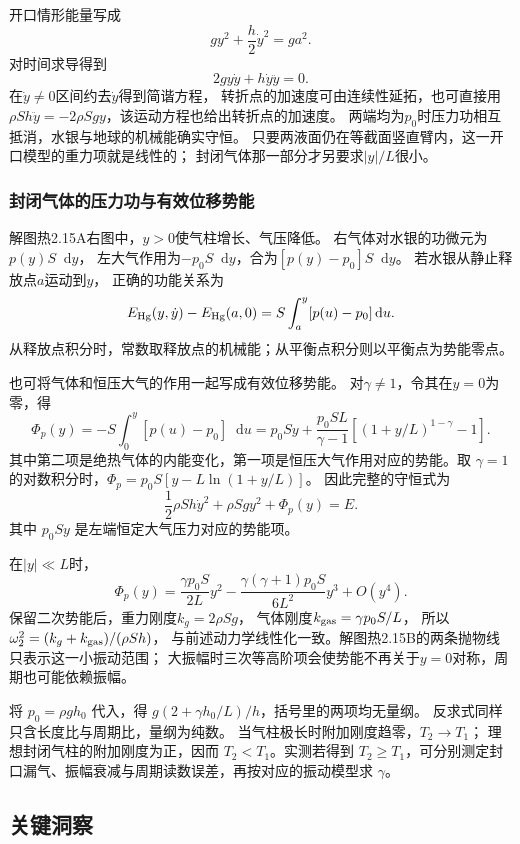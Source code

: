 \documentclass[UTF8,fontset=fandol,a4paper,11pt]{ctexart}
\newcommand{\dd}{\mathop{}\!\mathrm{d}}
\begin{document}
开口情形能量写成
\[
gy^2+\frac h2\dot y^2=ga^2.
\]
对时间求导得到
\[
2gy\dot y+h\dot y\ddot y=0.
\]
在$\dot y\ne0$区间约去$\dot y$得到简谐方程，
转折点的加速度可由连续性延拓，也可直接用
$\rho Sh\ddot y=-2\rho Sgy$，该运动方程也给出转折点的加速度。
两端均为$p_0$时压力功相互抵消，水银与地球的机械能确实守恒。
只要两液面仍在等截面竖直臂内，这一开口模型的重力项就是线性的；
封闭气体那一部分才另要求$|y|/L$很小。

\subsubsection*{封闭气体的压力功与有效位移势能}
解图热2.15A右图中，$y>0$使气柱增长、气压降低。
右气体对水银的功微元为$p(y)S\dd y$，
左大气作用为$-p_0S\dd y$，合为$[p(y)-p_0]S\dd y$。
若水银从静止释放点$a$运动到$y$，
正确的功能关系为
\[
E_{\rm Hg}(y,\dot y)-E_{\rm Hg}(a,0)
=S\int_a^y[p(u)-p_0]\dd u.
\]
从释放点积分时，常数取释放点的机械能；从平衡点积分则以平衡点为势能零点。

也可将气体和恒压大气的作用一起写成有效位移势能。
对$\gamma\ne1$，令其在$y=0$为零，得
\[
\Phi_p(y)=-S\int_0^y[p(u)-p_0]\dd u
=p_0Sy+\frac{p_0SL}{\gamma-1}
[(1+y/L)^{1-\gamma}-1].
\]
其中第二项是绝热气体的内能变化，第一项是恒压大气作用对应的势能。取 $\gamma=1$ 的对数积分时，$\Phi_p=p_0S[y-L\ln(1+y/L)]$。
因此完整的守恒式为
\[
\frac12\rho Sh\dot y^2+\rho Sgy^2+\Phi_p(y)=E.
\]
其中 $p_0Sy$ 是左端恒定大气压力对应的势能项。

在$|y|\ll L$时，
\[
\Phi_p(y)=\frac{\gamma p_0S}{2L}y^2
-\frac{\gamma(\gamma+1)p_0S}{6L^2}y^3+O(y^4).
\]
保留二次势能后，重力刚度$k_g=2\rho Sg$，
气体刚度$k_{\rm gas}=\gamma p_0S/L$，
所以$\omega_2^2=(k_g+k_{\rm gas})/(\rho Sh)$，
与前述动力学线性化一致。解图热2.15B的两条抛物线只表示这一小振动范围；
大振幅时三次等高阶项会使势能不再关于$y=0$对称，周期也可能依赖振幅。

将 $p_0=\rho gh_0$ 代入，得
$g(2+\gamma h_0/L)/h$，括号里的两项均无量纲。
反求式同样只含长度比与周期比，量纲为纯数。
当气柱极长时附加刚度趋零，$T_2\to T_1$；
理想封闭气柱的附加刚度为正，因而 $T_2<T_1$。实测若得到 $T_2\ge T_1$，可分别测定封口漏气、振幅衰减与周期读数误差，再按对应的振动模型求 $\gamma$。




\subsection*{关键洞察}
\end{document}

